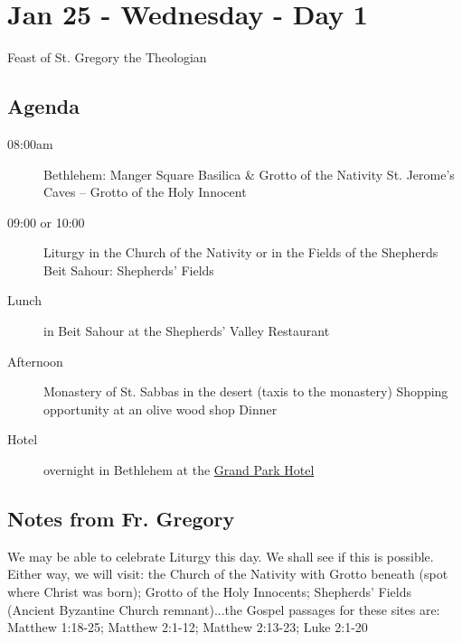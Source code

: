 \documentclass[letterpaper]{report}
\begin{document}


\clearpage
\section{Jan 25 - Wednesday - Day 1}
Feast of St. Gregory the Theologian

\subsection{Agenda}
\begin{description}
	\item[08:00am] Bethlehem: Manger Square
	    \subitem Basilica \& Grotto of the Nativity
	    \subitem St. Jerome's Caves – Grotto of the Holy Innocent
	\item[09:00 or 10:00] Liturgy in the Church of the Nativity or in the 
		Fields of the Shepherds
		\subitem Beit Sahour: Shepherds’ Fields
	\item[Lunch] in Beit Sahour at the Shepherds’ Valley Restaurant 
	\item[Afternoon] Monastery of St. Sabbas in the desert 
	    (taxis to the monastery)
	    \subitem Shopping opportunity at an olive wood shop Dinner 
	    
	\item[Hotel] overnight in Bethlehem at the
	  \href{http://www.grandpark.com/bethlehem/}{Grand Park Hotel}
\end{description}

\subsection{Notes from Fr. Gregory}
We may be able to celebrate Liturgy this day. We shall see if this is possible. Either way, we will visit: the Church of the Nativity with Grotto beneath (spot where Christ was born); Grotto of the Holy Innocents; Shepherds' Fields (Ancient Byzantine Church remnant)...the Gospel passages for these sites are: 
Matthew 1:18-25; Matthew 2:1-12; Matthew 2:13-23; Luke 2:1-20
\end{document}
